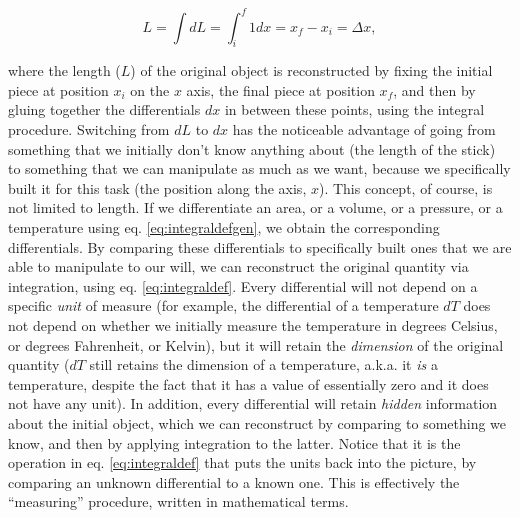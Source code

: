\documentclass[
  9pt,
]{extbook}
\theoremstyle{definition}
\theoremstyle{definition}
\theoremstyle{definition}
\theoremstyle{remark}
\begin{document}
\begin{equation}
L=\int dL = \int_{i}^{f} 1 dx = x_f-x_i =\Delta x,
\label{eq:integraldef}
\end{equation}

where the length (\(L\)) of the original object is reconstructed by fixing the initial piece at position \(x_i\) on the \(x\) axis, the final piece at position \(x_f\), and then by gluing together the differentials \(dx\) in between these points, using the integral procedure. Switching from \(dL\) to \(dx\) has the noticeable advantage of going from something that we initially don't know anything about (the length of the stick) to something that we can manipulate as much as we want, because we specifically built it for this task (the position along the axis, \(x\)). This concept, of course, is not limited to length. If we differentiate an area, or a volume, or a pressure, or a temperature using eq. \eqref{eq:integraldefgen}, we obtain the corresponding differentials. By comparing these differentials to specifically built ones that we are able to manipulate to our will, we can reconstruct the original quantity via integration, using eq. \eqref{eq:integraldef}. Every differential will not depend on a specific \emph{unit} of measure (for example, the differential of a temperature \(dT\) does not depend on whether we initially measure the temperature in degrees Celsius, or degrees Fahrenheit, or Kelvin), but it will retain the \emph{dimension} of the original quantity (\(dT\) still retains the dimension of a temperature, a.k.a. it \emph{is} a temperature, despite the fact that it has a value of essentially zero and it does not have any unit). In addition, every differential will retain \emph{hidden} information about the initial object, which we can reconstruct by comparing to something we know, and then by applying integration to the latter. Notice that it is the operation in eq. \eqref{eq:integraldef} that puts the units back into the picture, by comparing an unknown differential to a known one. This is effectively the ``measuring'' procedure, written in mathematical terms.
\end{document}
